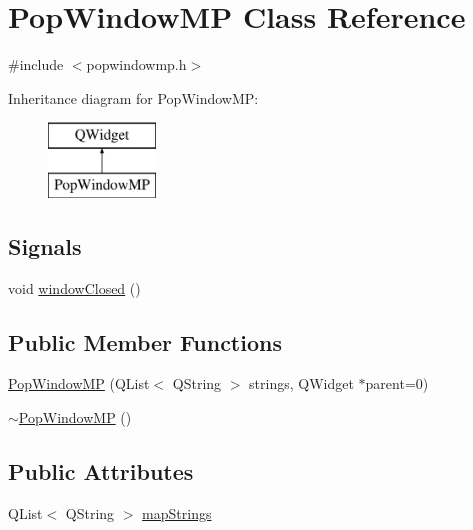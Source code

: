 \hypertarget{class_pop_window_m_p}{}\section{Pop\+Window\+M\+P Class Reference}
\label{class_pop_window_m_p}


{\ttfamily \#include $<$popwindowmp.\+h$>$}

Inheritance diagram for Pop\+Window\+M\+P\+:\begin{figure}[H]
\begin{center}
\leavevmode
\includegraphics[height=2.000000cm]{class_pop_window_m_p}
\end{center}
\end{figure}
\subsection*{Signals}
\begin{DoxyCompactItemize}
\item 
void \hyperlink{class_pop_window_m_p_aea9a78b6f0f6bb6536c7481ed67ad66d}{window\+Closed} ()
\end{DoxyCompactItemize}
\subsection*{Public Member Functions}
\begin{DoxyCompactItemize}
\item 
\hyperlink{class_pop_window_m_p_a3298919d76ea83d8bab145bbfaba7668}{Pop\+Window\+M\+P} (Q\+List$<$ Q\+String $>$ strings, Q\+Widget $\ast$parent=0)
\item 
\hyperlink{class_pop_window_m_p_aa58c893a6ddb936e79d4ee329dab11c6}{$\sim$\+Pop\+Window\+M\+P} ()
\end{DoxyCompactItemize}
\subsection*{Public Attributes}
\begin{DoxyCompactItemize}
\item 
Q\+List$<$ Q\+String $>$ \hyperlink{class_pop_window_m_p_a95b9fb0c455dce6924a1a7282fd13b00}{map\+Strings}
\end{DoxyCompactItemize}


